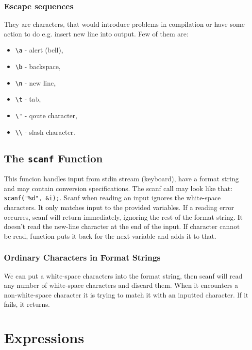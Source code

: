 \documentclass[12pt, openany]{book}
\begin{document}
    \subsection*{Escape sequences}
    They are characters, that would introduce problems in compilation or have some action
    to do e.g. insert new line into output. Few of them are:
    \begin{itemize}
        \item \texttt{\textbackslash a} - alert (bell),
        \item \texttt{\textbackslash b} - backspace,
        \item \texttt{\textbackslash n} - new line,
        \item \texttt{\textbackslash t} - tab,
        \item \texttt{\textbackslash "} - qoute character,
        \item \texttt{\textbackslash\textbackslash} - slash character.
    \end{itemize}

    \section{The \texttt{scanf} Function}
    This funcion handles input from stdin stream (keyboard),  have a format string
    and may contain conversion specifications. The scanf call may look like that:
    \texttt{scanf("\%d", \&i);}. Scanf when reading an input ignores the white-space
    characters. It only matches input to the provided variables. If a reading error
    occurres, scanf will return immediately, ignoring the rest of the format string.
    It doesn't read the new-line character at the end of the input. If character
    cannot be read, function puts it back for the next variable and adds it to that.

    \subsection*{Ordinary Characters in Format Strings}
    We can put a white-space characters into the format string, then scanf will read
    any number of white-space characters and discard them. When it encounters a
    non-white-space character it is trying to match it with an inputted character.
    If it fails, it returns.

    \chapter{Expressions}
\end{document}
